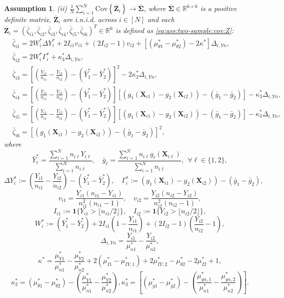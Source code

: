 \documentclass[12pt,letterpaper]{article}
\newtheorem{assumption}{Assumption}[section]
\begin{document}
\begin{assumption}
\noindent (ii) $\displaystyle\frac{1}{N}\sum_{i=1}^N\mathrm{Cov}\left\{\overline{\mathbf{Z}}_i\right\}\rightarrow\overline{\boldsymbol{\Sigma}}$, where $\overline{\boldsymbol{\Sigma}}\in\mathbb{R}^{6\times 6}$ is a positive definite matrix, $\overline{\mathbf{Z}}_i$ are i.n.i.d. across $i\in[N]$ and each $\overline{\mathbf{Z}}_i=(\bar{\zeta}_{i1},\bar{\zeta}_{i2},\bar{\zeta}_{i3},\bar{\zeta}_{i4},\bar{\zeta}_{i5},\bar{\zeta}_{i6})^T\in\mathbb{R}^6$ is defined as \eqref{eq:ass:two-sample:cov:Z}:
\begin{equation}\label{eq:ass:two-sample:cov:Z}
\begin{array}{rcl}
&\displaystyle\bar{\zeta}_{i1}=2W_i^*\Delta Y_i^*+2I_{i1}v_{i1}+(2I_{i2}-1)v_{i2}+[(\mu_{\theta1}^*-\mu_{\theta2}^*)-2\kappa^*]\Delta_{i,Yn},&\\
&\displaystyle\bar{\zeta}_{i2}=2W_i^*\Gamma_i^*+\kappa_3^*\Delta_{i,Yn},&\\
&\displaystyle\bar{\zeta}_{i3}=\left[\left(\frac{Y_{i1}}{n_{i1}}-\frac{Y_{i2}}{n_{i2}}\right)-(\bar{Y}_1^*-\bar{Y}_2^*)\right]^2-2\kappa_2^*\Delta_{i,Yn},&\\
&\displaystyle\bar{\zeta}_{i4}=\left[\left(\frac{Y_{i1}}{n_{i1}}-\frac{Y_{i2}}{n_{i2}}\right)-(\bar{Y}_1^*-\bar{Y}_2^*)\right][(g_1(\mathbf{X}_{i1})-g_2(\mathbf{X}_{i2}))-(\bar{g}_1-\bar{g}_2)]-\kappa_3^*\Delta_{i,Yn},&\\
&\displaystyle\bar{\zeta}_{i5}=\left[\left(\frac{Y_{i1}}{n_{i1}}-\frac{Y_{i2}}{n_{i2}}\right)-(\bar{Y}_1^*-\bar{Y}_2^*)\right][(g_1(\mathbf{X}_{i1})-g_2(\mathbf{X}_{i2}))-(\bar{g}_1-\bar{g}_2)]-\kappa_3^*\Delta_{i,Yn},&\\
&\displaystyle\bar{\zeta}_{i6}=[(g_1(\mathbf{X}_{i1})-g_2(\mathbf{X}_{i2}))-(\bar{g}_1-\bar{g}_2)]^2,&
\end{array}
\end{equation}
where 
$$\bar{Y}_\ell^*=\frac{\sum_{i=1}^Nn_{i\ell}Y_{i\ell}}{\sum_{i=1}^Nn_{i\ell}},\quad \bar{g}_{\ell}=\frac{\sum_{i=1}^Nn_{i\ell}g_{\ell}(\mathbf{X}_{i\ell})}{\sum_{i=1}^Nn_{i\ell}},\ \ \forall \ell\in\{1,2\},$$
$$\Delta Y_i^*:=\left(\frac{Y_{i1}}{n_{i1}}-\frac{Y_{i2}}{n_{i2}}\right)-(\bar{Y}_1^*-\bar{Y}_2^*),\quad \Gamma_i^*:=(g_1(\mathbf{X}_{i1})-g_2(\mathbf{X}_{i2}))-(\bar{g}_1-\bar{g}_2),$$
$$v_{i1}=\frac{Y_{i1}(n_{i1}-Y_{i1})}{n_{i1}^2(n_{i1}-1)},\quad v_{i2}=\frac{Y_{i2}(n_{i2}-Y_{i2})}{n_{i2}^2(n_{i2}-1)},$$
$$I_{i1}:=\mathbf{1}\{Y_{i1}>\lfloor n_{i1}/2\rfloor\},\quad I_{i2}:=\mathbf{1}\{Y_{i2}>\lfloor n_{i2}/2\rfloor\},$$
$$W_i^*:=(\bar{Y}_1^*-\bar{Y}_2^*)+2I_{i1}\left(1-\frac{Y_{i1}}{n_{i1}}\right)+(2I_{i2}-1)\left(\frac{Y_{i2}}{n_{i2}}-1\right),$$
$$\Delta_{i,Yn}=\frac{Y_{i1}}{\mu_{n1}^*}-\frac{Y_{i2}}{\mu_{n2}^*},$$
$$\kappa^*=\frac{\mu_{Y1}^*}{\mu_{n1}^*}-\frac{\mu_{Y2}^*}{\mu_{n2}^*}+2(\mu_{I1}^*-\mu_{IY,1}^*)+2\mu_{IY,2}^*-\mu_{\theta2}^*-2\mu_{I2}^*+1,$$
$$\kappa_2^*=\left(\mu_{\theta1}^*-\mu_{\theta2}^*\right)-\left(\frac{\mu_{Y1}^*}{\mu_{n1}^*}-\frac{\mu_{Y2}^*}{\mu_{n2}^*}\right),\kappa_3^*=\left[(\mu_{g1}^*-\mu_{g2}^*)-\left(\frac{\mu_{gn,1}^*}{\mu_{n1}^*}-\frac{\mu_{gn,2}^*}{\mu_{n2}^*}\right)\right].$$
\end{assumption}
\end{document}
